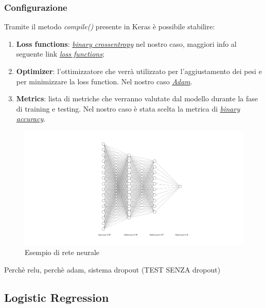 \subsubsection{Configurazione}
Tramite il metodo \textit{compile()} presente in Keras è possibile stabilire:
\begin{enumerate}
\item \textbf{Loss functions}: \href{https://en.wikipedia.org/wiki/Cross_entropy}{\textit{binary crossentropy}} nel nostro caso, maggiori info al seguente link \href{https://keras.io/losses/}{\textit{loss functions}};
\item \textbf{Optimizer}: l'ottimizzatore che verrà utilizzato per l'aggiustamento dei pesi e per minimizzare la loss function.
Nel nostro caso \href{https://arxiv.org/pdf/1412.6980v8.pdf}{\textit{Adam}}. 
\item \textbf{Metrics}: lista di metriche che verranno valutate dal modello durante la fase di training e testing.
Nel nostro caso è stata scelta la metrica di \href{https://keras.io/metrics/#binary_accuracy}{\textit{binary accuracy}}.  
\end{enumerate} 

\begin{figure}[H]
\includegraphics[scale=0.5,center]{img/nnExample.png}
\caption{Esempio di rete neurale}
\end{figure}

Perchè relu, perchè adam, sistema dropout
(TEST SENZA dropout)
\subsection{Logistic Regression}